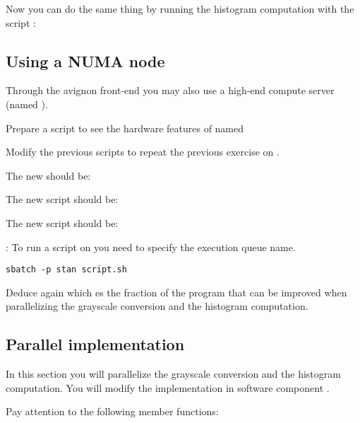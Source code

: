 Now you can do the same thing by running the histogram computation with the
script :


\subsection{Using a NUMA node}

Through the avignon front-end you may also use a high-end compute server (named
).

Prepare a script to see the hardware features of  named



Modify the previous scripts to repeat the previous exercise on .

The new  should be:



The new script  should be:



The new script  should be:



: To run a script on  you need to specify the
execution queue name.

\begin{lstlisting}[style=terminal]
sbatch -p stan script.sh
\end{lstlisting}

Deduce again which es the fraction of the program that can be improved when
parallelizing the grayscale conversion and the histogram computation.

\subsection{Parallel implementation}

In this section you will parallelize the grayscale conversion and the histogram
computation. You will modify the implementation in software component
.

Pay attention to the following member functions:

